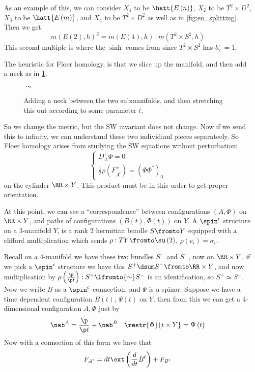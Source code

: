 \documentclass{amsart}
\begin{document}
As an example of this, we can consider $X_1$ to be $\hatt{E\left( n \right)}$,
$X_2$ to be $T^2 \times D^2$, 
$X_3$ to be $\hatt{E\left( m \right)}$, and $X_4$ to be $T^2 \times D^2$ as well
as in \cref{fig:en_splitting}.
Then we get
\begin{equation}
m\left( E\left( 2 \right) , h \right)^2 = 
m\left( E\left( 4 \right) , h \right) \cdot m\left( T^2 \times S^2 , h \right)
\end{equation}
This second multiple is where the $\sinh$ comes from since $T^2 \times S^2$ has $b_2^+ = 1$.

The heuristic for Floer homology, is that we slice up the manifold, and then add a neck
as in \cref{fig:neck}.
\begin{figure}
$\leadsto$
\caption{Adding a neck between the two submanifolds, and then stretching this out according
to some parameter $t$.}
\label{fig:neck}
\end{figure}
So we change the metric, but the SW invariant does not change. 
Now if we send this to infinity, we can understand these two individiaul pieces separateely.
So Floer homology arises from studying the SW equations without perturbation:
\begin{equation}
\begin{cases}
D_A^+ \Phi = 0 \\
\frac{1}{2}\rho\left( F_{A^t}^+ \right) = 
\left( \Phi \Phi^* \right)_0
\end{cases}
\end{equation}
on the cylinder $\RR\times Y$.
This product must be in this order to get proper orientation.

At this point, we can see a ``correspondence'' between configurations
$\left( A , \Phi \right)$ on $\RR\times Y$, and 
paths of configurations $\left( B\left( t \right) , \Phi\left( t \right) \right)$ on $Y$. 
A $\spin^c$ structure on a $3$-manifold $Y$, is a rank $2$ hermitian bundle
$S\fromto Y$ equipped with a clifford multiplication which sends 
$\rho: TY \fromto \su\left( 2 \right)$, 
$\rho\left( e_i \right) = \sigma_i$.

Recall on a $4$-manifold we have these two bundles $S^+$ and $S^-$, 
now on $\RR\times Y$, if we pick a $\spin^c$ structure we have this $S^+ \dsum S^-\fromto \RR\times Y$, 
and now multiplication by $\rho\left( \frac{\p}{\p t} \right):S^+\lfromto{\sim} S^-$ 
is an identification, so $S^+\simeq S^-$. 
Now we write $B$ as a $\spin^c$ connection, and $\Psi$ is a spinor.
Suppose we have a time dependent configuration $B\left( t \right)$, $\Psi\left( t \right)$ on $Y$, 
then from this we can get a $4$-dimensional configuration 
$A , \Phi$ just by 
\begin{align}
\nab^A = \frac{\p}{\p t} + \nab^B 
&&
\restr{\Phi}{ {t}\times Y }= \Psi\left( t \right)
\end{align}
Now with a connection of this form we have that
\begin{equation}
F_{A^t} = 
dt \ext\left( \frac{d}{dt} B^t \right) + F_{B^t}
\end{equation}
\end{document}
